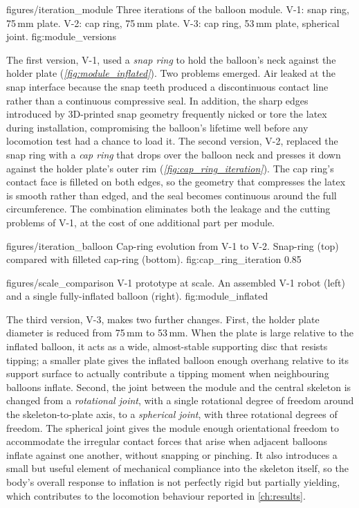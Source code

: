 \figcap
{figures/iteration_module}
{Three iterations of the balloon module.}
{V-1: snap ring, 75\,mm plate. V-2: cap ring, 75\,mm plate. V-3: cap ring, 53\,mm plate, spherical joint.}
{fig:module_versions}
{\linewidth}

The first version, V-1, used a \textit{snap ring} to hold the balloon's neck against the holder plate (\textit{\cref{fig:module_inflated}}). Two problems emerged. Air leaked at the snap interface because the snap teeth produced a discontinuous contact line rather than a continuous compressive seal. In addition, the sharp edges introduced by 3D-printed snap geometry frequently nicked or tore the latex during installation, compromising the balloon's lifetime well before any locomotion test had a chance to load it. The second version, V-2, replaced the snap ring with a \textit{cap ring} that drops over the balloon neck and presses it down against the holder plate's outer rim (\textit{\cref{fig:cap_ring_iteration}}). The cap ring's contact face is filleted on both edges, so the geometry that compresses the latex is smooth rather than edged, and the seal becomes continuous around the full circumference. The combination eliminates both the leakage and the cutting problems of V-1, at the cost of one additional part per module.

\figcap
{figures/iteration_balloon}
{Cap-ring evolution from V-1 to V-2.}
{Snap-ring (top) compared with filleted cap-ring (bottom).}
{fig:cap_ring_iteration}
{0.85\linewidth}

\figcap
{figures/scale_comparison}
{V-1 prototype at scale.}
{An assembled V-1 robot (left) and a single fully-inflated balloon (right).}
{fig:module_inflated}
{\linewidth}

The third version, V-3, makes two further changes. First, the holder plate diameter is reduced from 75\,mm to 53\,mm. When the plate is large relative to the inflated balloon, it acts as a wide, almost-stable supporting disc that resists tipping; a smaller plate gives the inflated balloon enough overhang relative to its support surface to actually contribute a tipping moment when neighbouring balloons inflate. Second, the joint between the module and the central skeleton is changed from a \textit{rotational joint}, with a single rotational degree of freedom around the skeleton-to-plate axis, to a \textit{spherical joint}, with three rotational degrees of freedom. The spherical joint gives the module enough orientational freedom to accommodate the irregular contact forces that arise when adjacent balloons inflate against one another, without snapping or pinching. It also introduces a small but useful element of mechanical compliance into the skeleton itself, so the body's overall response to inflation is not perfectly rigid but partially yielding, which contributes to the locomotion behaviour reported in \cref{ch:results}.

